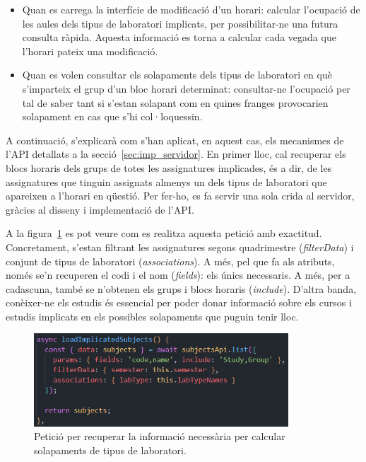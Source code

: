 \documentclass[a4paper,12pt]{ThesisStyle}
\begin{document}
\begin{itemize}
  \item Quan es carrega la interfície de modificació d'un horari: calcular l'ocupació de les aules dels tipus de laboratori implicats, per possibilitar-ne una futura consulta ràpida. Aquesta informació es torna a calcular cada vegada que l'horari pateix una modificació.
  \item Quan es volen consultar els solapaments dels tipus de laboratori en què s'imparteix el grup d'un bloc horari determinat: consultar-ne l'ocupació per tal de saber tant si s'estan solapant com en quines franges provocarien solapament en cas que s'hi col·loquessin.
\end{itemize}

\newpage

A continuació, s'explicarà com s'han aplicat, en aquest cas, els mecanismes de l'API detallats a la secció~\ref{sec:imp_servidor}. En primer lloc, cal recuperar els blocs horaris dels grups de totes les assignatures implicades, és a dir, de les assignatures que tinguin assignats almenys un dels tipus de laboratori que apareixen a l'horari en qüestió. Per fer-ho, es fa servir una sola crida al servidor, gràcies al disseny i implementació de l'API.

A la figura~\ref{img:cridaAssignatures} es pot veure com es realitza aquesta petició amb exactitud. Concretament, s'estan filtrant les assignatures segons quadrimestre (\textit{filterData}) i conjunt de tipus de laboratori (\textit{associations}). A més, pel que fa als atributs, només se'n recuperen el codi i el nom (\textit{fields}): els únics necessaris. A més, per a cadascuna, també se n'obtenen els grups i blocs horaris (\textit{include}). D'altra banda, conèixer-ne els estudis és essencial per poder donar informació sobre els cursos i estudis implicats en els possibles solapaments que puguin tenir lloc.

\begin{figure}[H]
  \centering
  \includegraphics[width=0.85\textwidth]{assets/code/solapaments/cridaAssignatures.png}
  \caption{\label{img:cridaAssignatures} Petició per recuperar la informació necessària per calcular solapaments de tipus de laboratori.}
\end{figure}
\end{document}
